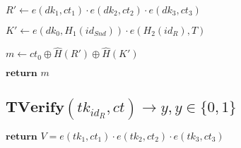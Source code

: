 \documentclass[a4paper]{article}
\begin{document}
$R' \gets e(\textit{dk}_1, \textit{ct}_1) \cdot e(\textit{dk}_2, \textit{ct}_2) \cdot e(\textit{dk}_3, \textit{ct}_3)$

$K' \gets e(\textit{dk}_0, H_1(\textit{id}_\textit{Snd})) \cdot e(H_2(\textit{id}_R), T)$

$m \gets \textit{ct}_0 \oplus \hat{H}(R') \oplus \hat{H}(K')$

$\textbf{return }m$

\subsection{$\textbf{TVerify}(\textit{tk}_{\textit{id}_R}, \textit{ct}) \rightarrow y, y \in \{0, 1\}$}

$\textbf{return }V = e(\textit{tk}_1, \textit{ct}_1) \cdot e(\textit{tk}_2, \textit{ct}_2) \cdot e(\textit{tk}_3, \textit{ct}_3)$
\end{document}
